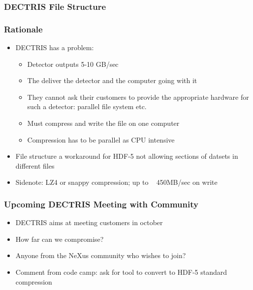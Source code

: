 \documentclass{beamer}
\begin{document}
\begin{frame} \frametitle{DECTRIS File Structure}
\begin{figure}[!ht]
\end{figure}
\end{frame}

\begin{frame}
\frametitle{Rationale}
\begin{itemize}
\item DECTRIS has a problem:
\begin{itemize}
\item Detector outputs 5-10 GB/sec
\item The deliver the detector and the computer going with it
\item They cannot ask their customers to provide the appropriate hardware for such 
 a detector: parallel file system etc.
\item Must compress and write the file on one computer
\item Compression has to be parallel as CPU intensive
\end{itemize}
\item File structure a workaround for HDF-5 not allowing sections of datsets in different 
 files
\item Sidenote: LZ4 or snappy compression; up to ~ 450MB/sec on write
\end{itemize}
\end{frame}


\begin{frame}
\frametitle{Upcoming DECTRIS Meeting with Community}
\begin{itemize}
\item DECTRIS aims at meeting customers in october
\item How far can we compromise?
\item Anyone from the NeXus community who wishes to join?
\item Comment from code camp: ask for tool to convert to HDF-5 standard compression
\end{itemize}
\end{frame}
\end{document}
